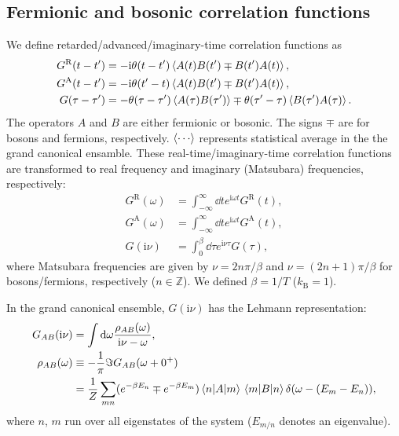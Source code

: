 \documentclass[submission, LectureNotes]{SciPost}
\newcommand\ii{\mathrm{i}}%
\newcommand\iv{\ii\nu}%
\begin{document}
\subsection{Fermionic and bosonic correlation functions}
We define retarded/advanced/imaginary-time correlation functions as
\begin{align}
	G^\mathrm{R}(t-t') &= -\ii \theta(t-t')\expval{A(t)B(t')\mp B(t')A(t)},\\
	G^\mathrm{A}(t-t') &= -\ii \theta(t'-t)\expval{A(t)B(t')\mp B(t')A(t)},\\
	G(\tau-\tau') &= -\theta(\tau-\tau')\expval{A(\tau)B(\tau')} \mp \theta(\tau'-\tau) \expval{B(\tau')A(\tau)}.
\end{align}
The operators $A$ and $B$ are either fermionic or bosonic.
The signs $\mp$ are for bosons and fermions, respectively.
$\expval{\cdots}$ represents statistical average in the the grand canonical ensamble.
%
These real-time/imaginary-time correlation functions are transformed to
real frequency and imaginary (Matsubara) frequencies, respectively:
\begin{align}
    G^\mathrm{R}(\omega) &= \int_{-\infty}^\infty \dd t e^{\ii\omega t}G^\mathrm{R}(t),\\
    G^\mathrm{A}(\omega) &= \int_{-\infty}^\infty \dd t e^{\ii\omega t}G^\mathrm{A}(t),\\
    G(\iv) &= \int_0^\beta \dd \tau e^{\iv \tau}G(\tau),\label{eq:matsubara-AB}
\end{align}
where Matsubara frequencies are given by $\nu = 2n\pi/\beta$ and $\nu = (2n+1)\pi/\beta$ for bosons/fermions, respectively ($n\in \mathbb{Z}$).
We defined $\beta = 1/T$ ($k_\mathrm{B}=1$).

In the grand canonical ensemble, $G(\iv)$ has the Lehmann representation:
\begin{align}
    G_{AB}(\iv) &= \int \dd \omega \frac{\rho_{AB}(\omega)}{\iv - \omega},\\
    \rho_{AB}(\omega) &\equiv -\frac{1}{\pi} \imaginary G_{AB}(\omega + 0^+)\\
    & = \frac{1}{Z}\sum_{mn}(e^{-\beta E_n} \mp e^{-\beta E_m})
    \mel{n}{A}{m}\mel{m}{B}{n}
    \delta(\omega - (E_m-E_n)),\label{eq:matsubara-lehmann}
\end{align}
where
$n$, $m$ run over all eigenstates of the system ($E_{m/n}$ denotes an eigenvalue).
\end{document}

